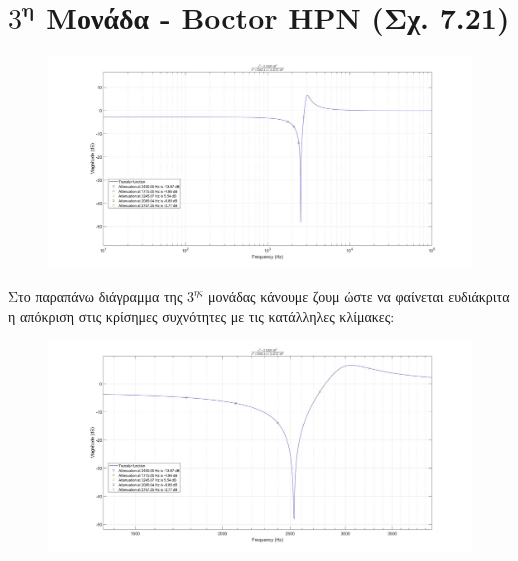 \documentclass{article}
\begin{document}
{{\section*{$3^\textbf{η}$ Μονάδα - Boctor HPN (Σχ. 7.21)} 
  \begin{figure}[h!]
\centering
 	\advance\leftskip-4cm
  \includegraphics[width=180mm,scale=2]{thema3/matlab2.jpg}
\end{figure}  
\normalsize{}
Στο παραπάνω διάγραμμα της $3^{ης}$ μονάδας κάνουμε ζουμ ώστε να φαίνεται ευδιάκριτα η απόκριση στις κρίσημες συχνότητες με τις κατάλληλες κλίμακες:
\large{}
  \begin{figure}[h!]
\centering
 	\advance\leftskip-1cm
  \includegraphics[width=120mm,scale=2]{thema3/z3.jpg}
\end{figure} 
\newpage
}}
\end{document}
